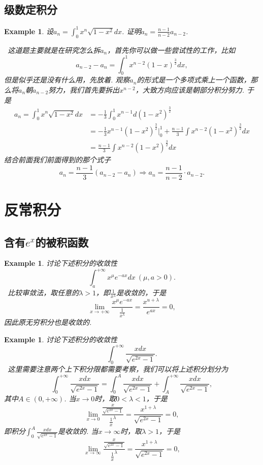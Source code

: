 \documentclass{article}
\newtheorem{example}[theorem]{Example}
\newcommand{\hints}{{\color{blue} \text{hints}}}
\begin{document}
\subsection{级数定积分}

\begin{example}
\rm 设$a_n = \int_0^1 x^n \sqrt{1-x^2}dx$. 证明$a_n = \frac{n-1}{n-2}a_{n-2}$. 

\hints\ 这道题主要就是在研究怎么拆$a_n$，首先你可以做一些尝试性的工作，比如
$$
a_{n-2}-a_n = \int_0^1 x^{n-2}(1-x)^{\frac{3}{2}}dx,
$$
但是似乎还是没有什么用，先放着. 观察$a_n$的形式是一个多项式乘上一个函数，那么将$a_n$朝$a_{n-2}$努力，我们首先要拆出$x^{n-2}$，大致方向应该是朝部分积分努力. 于是
$$
\begin{aligned}
a_n = \int_0^1 x^n \sqrt{1-x^2}dx &= -\frac{1}{3}\int_0^1  x^{n-1}d(1-x^2)^\frac{3}{2} \\
&= -\frac{1}{3}x^{n-1}(1-x^2)^{\frac{3}{2}} |_{0}^1 + \frac{n-1}{3} \int x^{n-2}(1-x^2)^\frac{3}{2} dx \\
&=  \frac{n-1}{3} \int x^{n-2}(1-x^2)^\frac{3}{2} dx
\end{aligned}
$$
结合前面我们前面得到的那个式子
$$
a_n = \frac{n-1}{3}(a_{n-2}-a_n) \Rightarrow a_n = \frac{n-1}{n-2} \cdot a_{n-2}. 
$$
\end{example}

\newpage
\section{反常积分}

\subsection{含有$e^x$的被积函数}

\begin{example}
\rm 讨论下述积分的收敛性
$$
\int_a^{+\infty} x^\mu e^{-ax}dx ~ (\mu,a > 0).
$$
\hints\ 比较审敛法，取任意的$\lambda > 1$，即$\frac{1}{x^\lambda}$是收敛的，于是
$$
\lim\limits_{x \to +\infty} \frac{x^\mu e^{-ax}}{\frac{1}{x^\lambda}} = \frac{x^{u+\lambda}}{e^{ax}} = 0,
$$
因此原无穷积分也是收敛的. 
\end{example}

\begin{example}
\rm 讨论下述积分的收敛性
$$
\int_0^{+\infty} \frac{xdx}{\sqrt{e^{2x}-1}}.
$$
\hints\ 这里需要注意两个上下积分限都需要考察，我们可以将上述积分划分为
$$
\int_0^{+\infty} \frac{xdx}{\sqrt{e^{2x}-1}} = \int_0^{A} \frac{xdx}{\sqrt{e^{2x}-1}} + \int_A^{+\infty} \frac{xdx}{\sqrt{e^{2x}-1}},
$$
其中$A \in (0,+\infty)$. 当$x \to 0$时，取$0 < \lambda < 1$，于是
$$
\lim\limits_{x \to 0} \frac{\frac{x}{\sqrt{e^{2x}-1}}}{\frac{1}{x}^\lambda} = \frac{x^{1+\lambda}}{\sqrt{e^{2x}-1}} = 0,
$$
即积分$\int_0^{A} \frac{xdx}{\sqrt{e^{2x}-1}}$是收敛的. 当$x \to \infty$时，取$\lambda > 1$，于是
$$
\lim\limits_{x \to \infty} \frac{\frac{x}{\sqrt{e^{2x}-1}}}{\frac{1}{x}^\lambda} =  \frac{x^{1+\lambda}}{\sqrt{e^{2x}-1}} = 0,
$$
\end{example}
\end{document}
